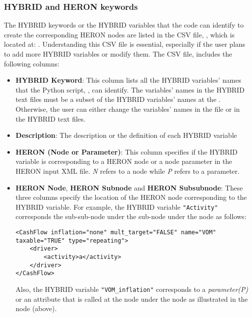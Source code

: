 \subsubsection{HYBRID and HERON keywords}
The HYBRID keywords or the HYBRID variables that the  code can identify to create the corresponding HERON nodes are listed in the CSV file, , which is located at: . Understanding this CSV file is essential, especially if the user plans to add more HYBRID variables or modify them. The CSV file,  includes the following columns:


\begin{itemize}
    \item \textbf{HYBRID Keyword}: This column lists all the HYBRID variables' names that the Python script, , can identify. The variables' names in the HYBRID text files must be a subset of the HYBRID variables' names at the . Otherwise, the user can either change the variables' names in the  file or in the HYBRID text files.    
    \item \textbf{Description}: The description or the definition of each HYBRID variable 
    \item \textbf{HERON (Node or Parameter)}: This column specifies if the HYBRID variable is corresponding to a HERON node or a node parameter in the HERON input XML file. \emph{N} refers to a node while \emph{P} refers to a parameter.
    \item \textbf{HERON Node}, \textbf{HERON Subnode} and \textbf{HERON Subsubnode}: These three columns specify the location of the HERON node corresponding to the HYBRID variable. For example, the HYBRID variable \verb|"Activity"| corresponds the sub-sub-node  under the  sub-node under the  node as follows:
    
    \begin{lstlisting}[style=XML,morekeywords={class}]
<CashFlow inflation="none" mult_target="FALSE" name="VOM" taxable="TRUE" type="repeating">
    <driver>
        <activity>a</activity>
    </driver>
</CashFlow>

    \end{lstlisting}
          Also, the HYBRID variable \verb|"VOM_inflation"| corresponds to a \emph{parameter(P)} or an attribute that is called  at the node  under the  node as illustrated in the  node (above).
    

\end{itemize}
